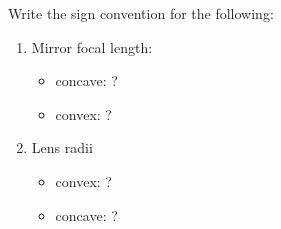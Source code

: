 

\vspace*{\fill}
\centering

Write the sign convention for the following:
\begin{enumerate}
    \item Mirror focal length:
   \begin{itemize}
      \item concave: ?
      \item convex: ?
   \end{itemize} 
    \item Lens radii
    \begin{itemize}
        \item convex: ?
        \item concave: ?
    \end{itemize}
\end{enumerate}

\centering
\vspace*{\fill}

